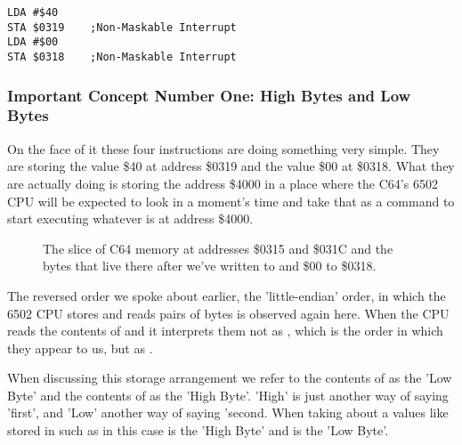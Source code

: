 \begin{lstlisting}[caption=Containing two important concepts.]
LDA #$40
STA $0319    ;Non-Maskable Interrupt
LDA #$00
STA $0318    ;Non-Maskable Interrupt
\end{lstlisting}

\subsubsection{Important Concept Number One: High Bytes and Low Bytes}
On the face of it these four instructions are doing something very simple. They are storing the value \$40
at address \$0319 and the value \$00 at \$0318. What they are actually doing is storing the address \$4000
in a place where the C64's 6502 CPU will be expected to look in a moment's time and take that as a command
to start executing whatever is at address \$4000.


\begin{figure}[H]
  {
    \setlength{\tabcolsep}{3.0pt}
    \setlength\cmidrulewidth{\heavyrulewidth} %
    \begin{adjustbox}{width=7cm,center}
    \end{adjustbox}
  }\caption{The slice of C64 memory at addresses \$0315 and \$031C and the bytes that live there after we've
written  to  and \$00 to \$0318.}
\end{figure}

The reversed order we spoke about earlier, the 'little-endian' order, in which the 6502 CPU stores and reads
pairs of bytes is observed again here. When the CPU reads the contents of  and 
it interprets them not as , which is the order in which they appear to us, but as .

When discussing this storage arrangement we refer to the contents of  as the 'Low Byte' and the
contents of  as the 'High Byte'. 'High' is just another way of saying 'first', and 'Low' another
way of saying 'second. When taking about a values like  stored in  such as in this case  is the
'High Byte' and  is the 'Low Byte'.

